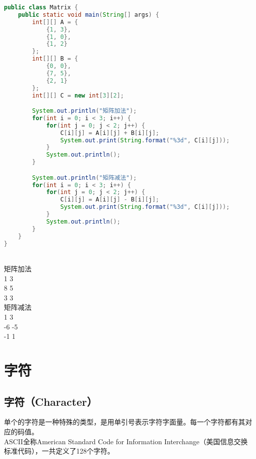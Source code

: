 \begin{lstlisting}[language=Java]
public class Matrix {
    public static void main(String[] args) {
        int[][] A = {
            {1, 3},
            {1, 0},
            {1, 2}
        };
        int[][] B = {
            {0, 0},
            {7, 5},
            {2, 1}
        };
        int[][] C = new int[3][2];

        System.out.println("矩阵加法");
        for(int i = 0; i < 3; i++) {
            for(int j = 0; j < 2; j++) {
                C[i][j] = A[i][j] + B[i][j];
                System.out.print(String.format("%3d", C[i][j]));
            }
            System.out.println();
        }

        System.out.println("矩阵减法");
        for(int i = 0; i < 3; i++) {
            for(int j = 0; j < 2; j++) {
                C[i][j] = A[i][j] - B[i][j];
                System.out.print(String.format("%3d", C[i][j]));
            }
            System.out.println();
        }
    }
}
\end{lstlisting}

\begin{tcolorbox}
	 \\
	矩阵加法 \\
	1  3 \\
	8  5 \\
	3  3 \\
	矩阵减法 \\
	1  3 \\
	-6 -5 \\
	-1  1
\end{tcolorbox}

\newpage

\section{字符}

\subsection{字符（Character）}

单个的字符是一种特殊的类型，是用单引号表示字符字面量。每一个字符都有其对应的码值。 \\

ASCII全称American Standard Code for Information Interchange（美国信息交换标准代码），一共定义了128个字符。


